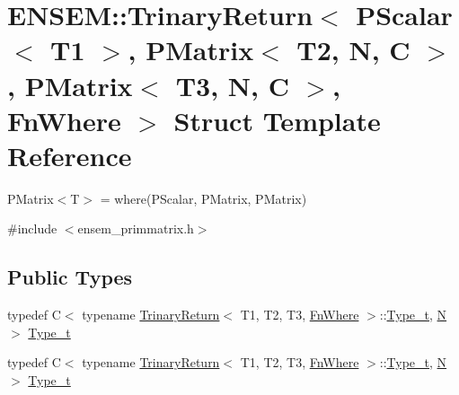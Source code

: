 \hypertarget{structENSEM_1_1TrinaryReturn_3_01PScalar_3_01T1_01_4_00_01PMatrix_3_01T2_00_01N_00_01C_01_4_00_0f44c172914945b9c1c722e99398bb914}{}\section{E\+N\+S\+EM\+:\+:Trinary\+Return$<$ P\+Scalar$<$ T1 $>$, P\+Matrix$<$ T2, N, C $>$, P\+Matrix$<$ T3, N, C $>$, Fn\+Where $>$ Struct Template Reference}
\label{structENSEM_1_1TrinaryReturn_3_01PScalar_3_01T1_01_4_00_01PMatrix_3_01T2_00_01N_00_01C_01_4_00_0f44c172914945b9c1c722e99398bb914}


P\+Matrix$<$\+T$>$ = where(\+P\+Scalar, P\+Matrix, P\+Matrix)  




{\ttfamily \#include $<$ensem\+\_\+primmatrix.\+h$>$}

\subsection*{Public Types}
\begin{DoxyCompactItemize}
\item 
typedef C$<$ typename \mbox{\hyperlink{structENSEM_1_1TrinaryReturn}{Trinary\+Return}}$<$ T1, T2, T3, \mbox{\hyperlink{structENSEM_1_1FnWhere}{Fn\+Where}} $>$\+::\mbox{\hyperlink{structENSEM_1_1TrinaryReturn_3_01PScalar_3_01T1_01_4_00_01PMatrix_3_01T2_00_01N_00_01C_01_4_00_0f44c172914945b9c1c722e99398bb914_a2f25acb4d9c917c29e862e4843292451}{Type\+\_\+t}}, \mbox{\hyperlink{operator__name__util_8cc_a7722c8ecbb62d99aee7ce68b1752f337}{N}} $>$ \mbox{\hyperlink{structENSEM_1_1TrinaryReturn_3_01PScalar_3_01T1_01_4_00_01PMatrix_3_01T2_00_01N_00_01C_01_4_00_0f44c172914945b9c1c722e99398bb914_a2f25acb4d9c917c29e862e4843292451}{Type\+\_\+t}}
\item 
typedef C$<$ typename \mbox{\hyperlink{structENSEM_1_1TrinaryReturn}{Trinary\+Return}}$<$ T1, T2, T3, \mbox{\hyperlink{structENSEM_1_1FnWhere}{Fn\+Where}} $>$\+::\mbox{\hyperlink{structENSEM_1_1TrinaryReturn_3_01PScalar_3_01T1_01_4_00_01PMatrix_3_01T2_00_01N_00_01C_01_4_00_0f44c172914945b9c1c722e99398bb914_a2f25acb4d9c917c29e862e4843292451}{Type\+\_\+t}}, \mbox{\hyperlink{operator__name__util_8cc_a7722c8ecbb62d99aee7ce68b1752f337}{N}} $>$ \mbox{\hyperlink{structENSEM_1_1TrinaryReturn_3_01PScalar_3_01T1_01_4_00_01PMatrix_3_01T2_00_01N_00_01C_01_4_00_0f44c172914945b9c1c722e99398bb914_a2f25acb4d9c917c29e862e4843292451}{Type\+\_\+t}}
\end{DoxyCompactItemize}


